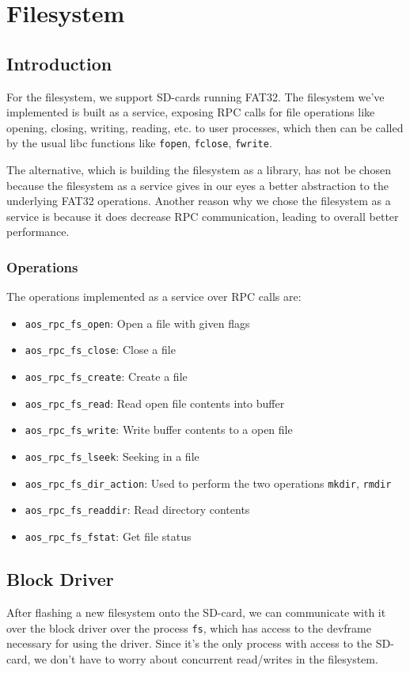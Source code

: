 \chapter{Filesystem}

\section{Introduction}
For the filesystem, we support SD-cards running FAT32. The filesystem we've implemented 
is built as a service, exposing RPC calls for file operations like opening, closing, writing, reading, etc. 
to user processes, which then can be called by the usual libc functions like \texttt{fopen}, \texttt{fclose}, \texttt{fwrite}.

The alternative, which is building the filesystem as a library, has not be chosen because the filesystem as a service 
gives in our eyes a better abstraction to the underlying FAT32 operations. Another reason why we chose the filesystem as a service
is because it does decrease RPC communication, leading to overall better performance.  

\subsection{Operations}
The operations implemented as a service over RPC calls are:
\begin{itemize}
    \item \texttt{aos\_rpc\_fs\_open}: Open a file with given flags
    \item \texttt{aos\_rpc\_fs\_close}: Close a file
    \item \texttt{aos\_rpc\_fs\_create}: Create a file
    \item \texttt{aos\_rpc\_fs\_read}: Read open file contents into buffer
    \item \texttt{aos\_rpc\_fs\_write}: Write buffer contents to a open file
    \item \texttt{aos\_rpc\_fs\_lseek}: Seeking in a file
    \item \texttt{aos\_rpc\_fs\_dir\_action}: Used to perform the two operations \texttt{mkdir}, \texttt{rmdir}
    \item \texttt{aos\_rpc\_fs\_readdir}: Read directory contents
    \item \texttt{aos\_rpc\_fs\_fstat}: Get file status
\end{itemize}

\section{Block Driver}
After flashing a new filesystem onto the SD-card, we can communicate with it over 
the block driver over the process \texttt{fs}, which has access to the devframe necessary
for using the driver. Since it's the only process with access to the SD-card, we don't have to worry 
about concurrent read/writes in the filesystem.

